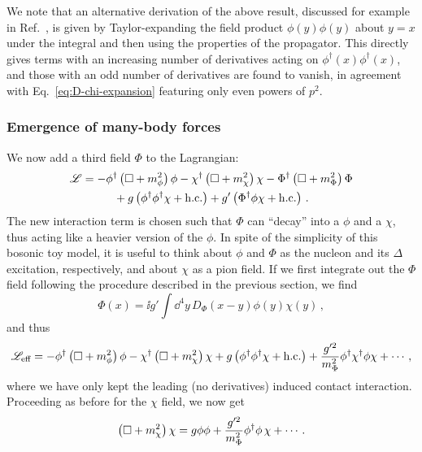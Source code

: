 We note that an alternative derivation of the above 
result, discussed for example in Ref.~\cite{Donoghue:1992}, is given by 
Taylor-expanding the field product $\phi(y) \phi(y)$ about $y=x$ under the 
integral and then using the properties of the propagator.  This directly gives 
terms with an increasing number of derivatives acting on $\phi^\dagger(x) 
\phi^\dagger(x)$, and those with an odd number of derivatives are found to 
vanish, in agreement with Eq.~\eqref{eq:D-chi-expansion} featuring only even 
powers of $p^2$.

\subsubsection{Emergence of many-body forces}

We now add a third field $\Phi$ to the Lagrangian:
%
\begin{multline}
 \LL = {-}\phi^\dagger\left(\dAlem + m_\phi^2\right)\phi
 - \chi^\dagger\left(\dAlem + m_\chi^2\right)\chi
 - \Phi^\dagger\left(\dAlem + m_\Phi^2\right)\Phi \\
 \null + g\left(\phi^\dagger\phi^\dagger\chi + \hc\right)
 + g'\left(\Phi^\dagger\phi\chi + \hc\right) \,.
\label{eq:L-phi-chi-Phi-rel}
\end{multline}
%
The new interaction term is chosen such that $\Phi$ can ``decay'' into a $\phi$ 
and a $\chi$, thus acting like a heavier version of the $\phi$.  In spite of 
the simplicity of this bosonic toy model, it is useful to think about $\phi$ 
and $\Phi$ as the nucleon and its $\Delta$ excitation, respectively, and about 
$\chi$ as a pion field.
%
If we first integrate out the $\Phi$ field following the procedure described in 
the previous section, we find
%
\begin{equation}
 \Phi(x) = \ii g' \int\dd^4y \, D_\Phi(x-y) \phi(y) \chi(y) \,,
\end{equation}
%
and thus
%
\begin{equation}
 \LL_{\text{eff}} = {-}\phi^\dagger\left(\dAlem + m_\phi^2\right)\phi
 - \chi^\dagger\left(\dAlem + m_\chi^2\right)\chi
 + g\left(\phi^\dagger\phi^\dagger\chi + \hc\right)
 + \frac{g'^2}{m_\Phi^2} \phi^\dagger\chi^\dagger\phi\chi
 + \cdots \,,
\label{eq:L-Phi-phi-chi-rel-eff-1}
\end{equation}
%
where we have only kept the leading (no derivatives) induced contact 
interaction.  Proceeding as before for the $\chi$ field, we now get
%
\begin{equation}
 \left(\dAlem + m_\chi^2\right)\chi = g\phi\phi
 + \frac{g'^2}{m_\Phi^2} \phi^\dagger \phi \, \chi 
 + \cdots \,.
\label{eq:chi-g-phiphi-etc-1}
\end{equation}
